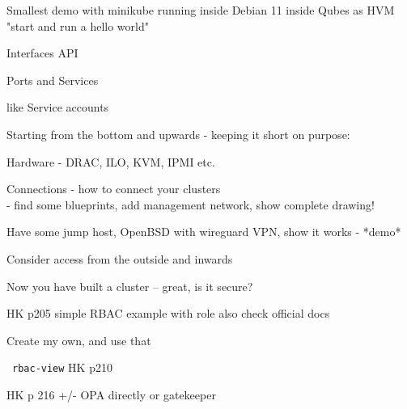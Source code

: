 \documentclass[Screen16to9,17pt]{foils}
\begin{document}

\begin{list2}
\item Smallest demo with minikube running inside Debian 11 inside Qubes as HVM
    "start and run a hello world"
\end{list2}


\begin{list2}
\item Interfaces API
\item Ports and Services
\end{list2}



\begin{list2}
\item like Service accounts
\end{list2}





Starting from the bottom and upwards - keeping it short on purpose:
\begin{list2}
\item Hardware - DRAC, ILO, KVM, IPMI etc.
\item Connections - how to connect your clusters\\
- find some blueprints, add management network, show complete drawing!
\item Have some jump host, OpenBSD with wireguard VPN, show it works - *demo*
\item Consider access from the outside and inwards
\end{list2}

Now you have built a cluster -- great, is it secure?


\begin{list2}
\item HK p205 simple RBAC example with role
also check official docs
\item Create my own, and use that
\end{list2}


\faWrench\ \verb+rbac-view+ HK p210



\begin{list2}
\item
\end{list2}
HK p 216 +/- OPA directly or gatekeeper
\end{document}
